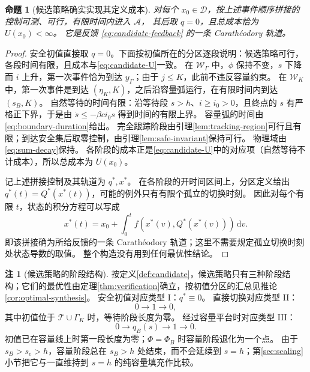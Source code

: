 \documentclass[11pt,a4paper,UTF8]{ctexart}
\newtheorem{proposition}[theorem]{命题}
\theoremstyle{definition}
\newtheorem{remark}[theorem]{注}
\newcommand{\Acal}{\mathcal A}
\newcommand{\Dcal}{\mathcal D}
\newcommand{\dd}{\,\mathrm d}
\begin{document}
\begin{proposition}[候选策略确实实现其定义成本]
\label{prop:candidate-attainment}
对每个 $x_0\in\Dcal$，按上述事件顺序拼接的控制可测、可行，有限时间内进入 $\Acal$，
其后取 $q=0$，且总成本恰为 $U(x_0)<\infty$。
它是反馈 \eqref{eq:candidate-feedback} 的一条 Carath\'eodory 轨道。
\end{proposition}
\begin{proof}
安全初值直接取 $q=0$。下面按初值所在的分区逐段说明：候选策略可行，各段时间有限，且成本与\eqref{eq:candidate-U}一致。
在 $\mathcal W_\Gamma$ 中，$\phi$ 保持不变，$s$ 下降而 $i$ 上升，第一次事件恰为到达 $y_\Gamma$；由于 $j\le K$，此前不违反容量约束。
在 $\mathcal W_K$ 中，第一次事件是到达 $(\eta_K,K)$，之后沿容量弧运行，在有限时间内到达 $(s_B,K)$。
自然等待的时间有限：沿等待段 $s>h$、$i\ge i_0>0$，且终点的 $s$ 有严格正下界，于是由 $\dot s\le-\beta ci_0s$ 得到时间的有限上界。
容量弧的时间由\eqref{eq:boundary-duration}给出。
完全跟踪阶段由引理\ref{lem:tracking-region}可行且有限；到达安全集后取零控制，由引理\ref{lem:safe-invariant}保持可行。
物理域由\eqref{eq:sum-decay}保持。
各阶段的成本正是\eqref{eq:candidate-U}中的对应项（自然等待不计成本），所以总成本为 $U(x_0)$。

记上述拼接控制及其轨道为 $q^*,x^*$。
在各阶段的开时间区间上，分区定义给出 $q^*(t)=Q^*(x^*(t))$，可能的例外只有有限个孤立的切换时刻。
因此对每个有限 $t$，状态的积分方程可以写成
\[
x^*(t)=x_0+\int_0^t f(x^*(v),Q^*(x^*(v)))\dd v.
\]
即该拼接确为所给反馈的一条 Carath\'eodory 轨道；这里不需要规定孤立切换时刻处状态导数的取值。
整个构造没有用到任何最优性结论。
\end{proof}

\begin{remark}[候选策略的阶段结构]
按定义\ref{def:candidate}，候选策略只有三种阶段结构；它们的最优性由定理\ref{thm:verification}确立，按初值分区的汇总见推论\ref{cor:optimal-synthesis}。
安全初值对应类型 I：$q^*\equiv0$。
直接切换对应类型 II：
\begin{equation}
0\longrightarrow1\longrightarrow0,
\label{eq:direct-structure}
\end{equation}
其中初值位于 $\mathcal T\cup\Gamma_K$ 时，等待阶段长度为零。
经过容量平台时对应类型 III：
\begin{equation}
0\longrightarrow q_B(s)\longrightarrow1\longrightarrow0.
\label{eq:capacity-structure}
\end{equation}
初值已在容量线上时第一段长度为零；$\Phi=\Phi_B$ 时容量阶段退化为一个点。
由于 $s_B>s_e>h$，容量阶段总在 $s_B>h$ 处结束，而不会延续到 $s=h$；第\ref{sec:scaling}小节把它与一直维持到 $s=h$ 的纯容量填充作比较。
\end{remark}
\end{document}
